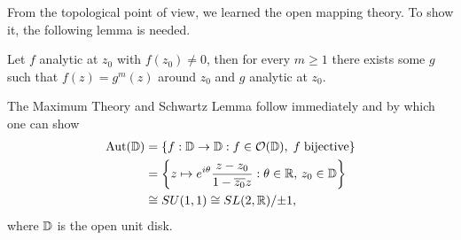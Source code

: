 From the topological point of view, we learned the open mapping theory. To show it, the following lemma is needed.
\begin{lem}
	Let $f$ analytic at $z_0$ with $f(z_0)\neq 0$, then for every $m\geq 1$ there exists some $g$ such that
	$f(z)=g^m(z)$ around $z_0$ and $g$ analytic at $z_0$.
\end{lem}
The Maximum Theory and Schwartz Lemma follow immediately and by which one can show
\begin{align*}
	\operatorname*{Aut}(\mathbb{D})&= \{f:\mathbb{D} \to \mathbb{D}: f\in \mathcal{O}(\mathbb{D}),\; f\;\mbox{bijective}\}\\
	       &= \left\{z\mapsto e^{i\theta} \frac{z-z_0}{1-\overline{z_0}z}: \theta\in\mathbb{R},\, z_0\in\mathbb{D}\right\}\\
	       &\cong SU(1,1)\cong SL(2,\mathbb{R})/{\pm 1},
\end{align*}
where $\mathbb{D}$ is the open unit disk.